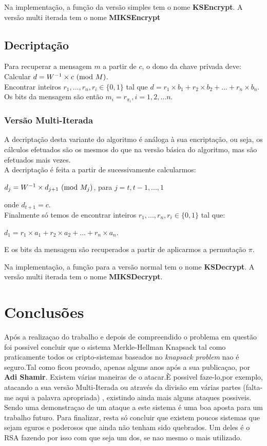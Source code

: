 \documentclass[11pt, language=portuguese]{report}
\begin{document}
Na implementação, a função da versão simples tem o nome \textbf{KSEncrypt}. A versão multi iterada tem o nome \textbf{MIKSEncrypt}

\section{Decriptação}
Para recuperar a mensagem $m$ a partir de $c$, o dono da chave privada deve:
Calcular $d = W^{-1}\times c \ (\mathrm{mod}\ M)$.
\\
Encontrar inteiros ${r_1, ..., r_n}, r_i \in \{0,1\}$ tal que $d = r_1 \times b_1 + r_2 \times b_2 + ... + r_n \times b_n$.
\\
Os bits da mensagem são então $m_i = r_{\pi_i}, i = 1, 2, ... n$.
\subsection{Versão Multi-Iterada}
A decriptação desta variante do algoritmo é análoga à sua encriptação, ou seja, os cálculos efetuados são os mesmos do que na versão básica do algoritmo, mas são efetuados mais vezes.
\\
A decriptação é feita a partir de sucessivamente calcularmos:
\begin{center}
	$d_j = W^{-1}\times d_{j+1} \ (\mathrm{mod}\ M_j)$, para $j = {t, t-1, ..., 1}$
\end{center}
onde $d_{t+1} = c$.
\\
Finalmente só temos de encontrar inteiros ${r_1, ..., r_n}, r_i \in \{0,1\}$ tal que:
\begin{center}
    $d_1 = r_1\times a_1 + r_2\times a_2 + ... + r_n\times a_n$.
\end{center}
E os bits da mensagem são recuperados a partir de aplicarmos a permutação $\pi$.

Na implementação, a função para a versão normal tem o nome \textbf{KSDecrypt}. A versão multi iterada tem o nome \textbf{MIKSDecrypt}.

\chapter{Conclusões}

Após a realizaçao do trabalho e depois de compreendido o problema em questão foi possivel concluir que o sistema Merkle-Hellman Knapsack tal como praticamente todos os cripto-sistemas baseados no \textit{knapsack problem} nao é seguro.Tal como ficou provado, apenas alguns anos após a sua publicaçao, por \textbf{Adi Shamir}. 
Existem várias maneiras de o atacar.È possivel faze-lo,por exemplo, atacando a sua versão Multi-Iterada ou através da divisão em várias partes (falta-me aqui a palavra apropriada) , existindo ainda mais alguns ataques possiveis. Sendo uma demonstraçao de um ataque a este sistema é uma boa aposta para um trabalho futuro.
Para finalizar, resta só concluir que existem poucos sistemas que sejam eguros e poderosos que ainda não tenham sido quebrados. Um deles é o RSA fazendo por isso com que seja um dos, se nao mesmo o mais utilizado. 

\printbibliography
\end{document}
